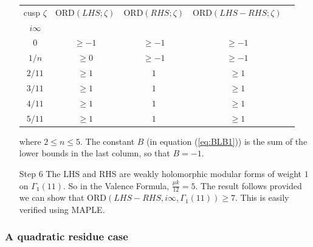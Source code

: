 \documentclass[12pt]{amsart}
\theoremstyle{definition}
\theoremstyle{remark}
\numberwithin{equation}{section}
\newcommand\ORD{\mbox{ORD}}
\newcommand\eqn[1]{(\ref{eq:#1})}
\begin{document}
\begin{enumerate}
\begin{center}
\begin{tabular}{c c c c c}
cusp $\zeta$ &  $\ORD(LHS;\zeta)$ & $\ORD(RHS;\zeta)$ 
& $\ORD(LHS-RHS;\zeta)$ \\
$i\infty$     &            &            &             \\
$0$          &  $\ge-1$   &  $\ge-1$   &   $\ge -1$  \\
$1/n$        &  $\ge0$ &  $\ge-1$   &   $\ge -1$  \\
$2/11$        &  $\ge1$    &  $1$       &   $\ge1$    \\ 
$3/11$        &  $\ge1$    &  $1$       &   $\ge 1$   \\ 
$4/11$        &  $\ge1$    &  $1$       &   $\ge 1$   \\ 
$5/11$        &  $\ge1$    &  $1$       &   $\ge 1$   \\ 
\end{tabular} 
\end{center} 
where $2\le n\le 5$. The constant $B$ (in equation \eqn{BLB1}) is
the sum of the lower bounds in the last column, so that $B=-1$.
\item[Step 6] The LHS and RHS are weakly holomorphic modular forms of 
weight $1$ on $\Gamma_1(11)$. So in the Valence Formula, 
$\frac{\mu k}{12} = 5$. 
The result follows provided we can show that 
$\ORD(LHS-RHS,i\infty,\Gamma_1(11))\geq 7$. 
This is easily verified using MAPLE.
\end{enumerate}

\subsubsection{\textbf{A quadratic residue case}}
\end{document}
